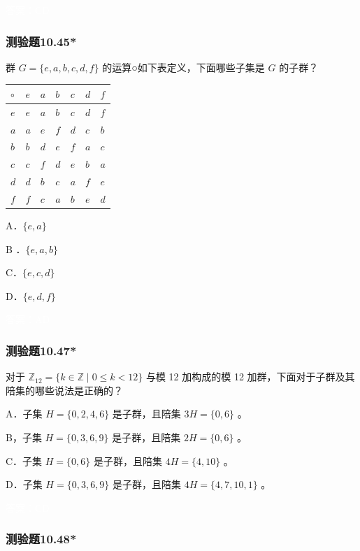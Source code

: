 \documentclass[UTF8, heading=true]{ctexart}
\begin{document}
\textcolor{white}{答案：CD}

\subsubsection{测验题10.45*}

群 $G=\{e, a, b, c, d, f\}$ 的运算○如下表定义，下面哪些子集是 $G$ 的子群？
\begin{table}[H]
  \renewcommand{\arraystretch}{1.5}
  \centering
\begin{tabular}{l|llllll}
\hline$\circ$ & $e$ & $a$ & $b$ & $c$ & $d$ & $f$ \\
\hline$e$ & $e$ & $a$ & $b$ & $c$ & $d$ & $f$ \\
$a$ & $a$ & $e$ & $f$ & $d$ & $c$ & $b$ \\
$b$ & $b$ & $d$ & $e$ & $f$ & $a$ & $c$ \\
$c$ & $c$ & $f$ & $d$ & $e$ & $b$ & $a$ \\
$d$ & $d$ & $b$ & $c$ & $a$ & $f$ & $e$ \\
$f$ & $f$ & $c$ & $a$ & $b$ & $e$ & $d$ \\
\hline
\end{tabular}
\end{table}

A．$\{e, a\}$

B ．$\{e, a, b\}$

C．$\{e, c, d\}$

D．$\{e, d, f\}$

\textcolor{white}{答案：AD}

\subsubsection{测验题10.47*}

对于 $\mathbb{Z}_{12}=\{k \in \mathbb{Z} \mid 0 \leq k<12\}$ 与模 12 加构成的模 12 加群，下面对于子群及其陪集的哪些说法是正确的？

A．子集 ${H}=\{0,2,4,6\}$ 是子群，且陪集 $3 {H}=\{0,6\}$ 。

B，子集 ${H}=\{0,3,6,9\}$ 是子群，且陪集 $2 {H}=\{0,6\}$ 。

C．子集 $H=\{0,6\}$ 是子群，且陪集 $4 {H}=\{4,10\}$ 。

D．子集 ${H}=\{0,3,6,9\}$ 是子群，且陪集 $4 {H}=\{4,7,10,1\}$ 。

\textcolor{white}{答案：CD}

\subsubsection{测验题10.48*}
\end{document}
